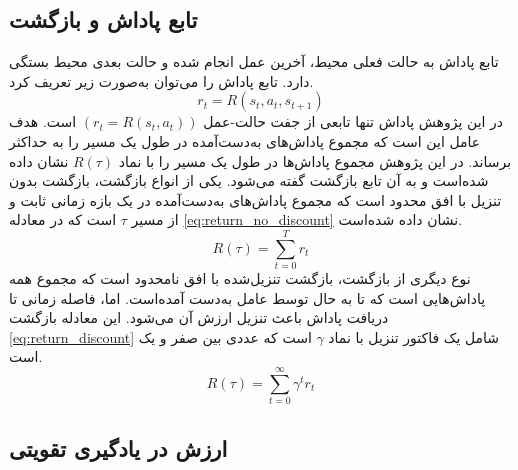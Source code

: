   
\subsection{تابع پاداش و بازگشت}
تابع پاداش به حالت فعلی محیط، آخرین عمل انجام شده و حالت بعدی محیط بستگی دارد. تابع پاداش را می‌توان به‌صورت زیر تعریف کرد.
\begin{equation}
	r_t = R(s_t, a_t, s_{t+1})
\end{equation}
در این پژوهش پاداش تنها تابعی از جفت حالت-عمل \((r_t = R(s_t, a_t))\) است.
هدف عامل این است که مجموع پاداش‌های به‌دست‌آمده در طول یک مسیر را به حداکثر برساند. در این پژوهش مجموع پاداش‌ها در طول یک مسیر را با نماد \(R(\tau)\) نشان داده‌ شده‌است و به آن تابع بازگشت
 گفته می‌شود.
یکی از انواع بازگشت، بازگشت بدون تنزیل با افق محدود
 است که مجموع پاداش‌های به‌دست‌آمده در یک بازه زمانی ثابت و از مسیر
 \(\tau\)
  است که در معادله 
  \eqref{eq:return_no_discount}
  نشان داده شده‌است.
 \begin{equation}
 	R(\tau) = \sum_{t = 0}^T r_t
 	\label{eq:return_no_discount}
 \end{equation}
نوع دیگری از بازگشت، بازگشت تنزیل‌شده با افق نامحدود
 است که مجموع همه پاداش‌هایی است که تا به حال توسط عامل به‌دست آمده‌است. اما، فاصله زمانی تا دریافت پاداش باعث تنزیل ارزش آن می‌شود. این معادله بازگشت \eqref{eq:return_discount} شامل یک فاکتور تنزیل
   با نماد \(\gamma\) است که
   عددی بین صفر و یک است.
    \begin{equation}
   	R(\tau) = \sum_{t = 0}^{\infty} \gamma^t r_t
   	\label{eq:return_discount}
   \end{equation}
   
   
   
 \subsection{ ارزش در یادگیری تقویتی}
   
